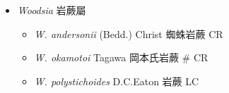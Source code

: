 
  \begin{itemize}
 \item[] \textit{Woodsia} 岩蕨屬
                                
  \begin{itemize}
        \item[] \textit{W. andersonii} (Bedd.) Christ  蜘蛛岩蕨   CR
        \item[] \textit{W. okamotoi} Tagawa  岡本氏岩蕨  \# CR
        \item[] \textit{W. polystichoides} D.C.Eaton  岩蕨   LC
  \end{itemize}
  \end{itemize}
